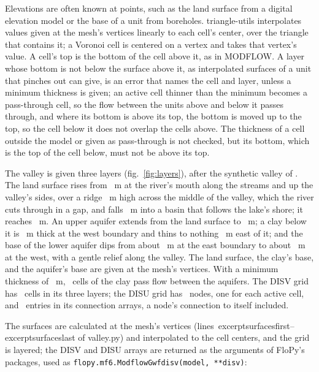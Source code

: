 \documentclass[11pt,twoside,twocolumn]{usgsreport}
\newcommand{\codelead}{\par\vskip 0pt plus 7\baselineskip\penalty -250\vskip 0pt plus -7\baselineskip}
\newcommand{\excerptlines}[1]{lines~\csname excerpt#1first\endcsname--\csname excerpt#1last\endcsname}
\begin{document}
Elevations are often known at points, such as the land surface from a digital elevation model or the base of a unit from boreholes. triangle-utils interpolates values given at the mesh's vertices linearly to each cell's center, over the triangle that contains it; a Voronoi cell is centered on a vertex and takes that vertex's value. A cell's top is the bottom of the cell above it, as in MODFLOW. A layer whose bottom is not below the surface above it, as interpolated surfaces of a unit that pinches out can give, is an error that names the cell and layer, unless a minimum thickness is given; an active cell thinner than the minimum becomes a pass-through cell, so the flow between the units above and below it passes through, and where its bottom is above its top, the bottom is moved up to the top, so the cell below it does not overlap the cells above. The thickness of a cell outside the model or given as pass-through is not checked, but its bottom, which is the top of the cell below, must not be above its top.

The valley is given three layers (fig.~\ref{fig:layers}), after the synthetic valley of \citet{hughes2024flopy}. The land surface rises from \rivermouth~m at the river's mouth along the streams and up the valley's sides, over a ridge \ridgeheight~m high across the middle of the valley, which the river cuts through in a gap, and falls \lakedepth~m into a basin that follows the lake's shore; it reaches \landsurfacemax~m. An upper aquifer extends from the land surface to \upperbottom~m; a clay below it is \claythickness~m thick at the west boundary and thins to nothing \clayedge~m east of it; and the base of the lower aquifer dips from about \baseeast~m at the east boundary to about \basewest~m at the west, with a gentle relief along the valley. The land surface, the clay's base, and the aquifer's base are given at the mesh's vertices. With a minimum thickness of \minimumthickness~m, \passthroughcells\ cells of the clay pass flow between the aquifers. The DISV grid has \disvcells\ cells in its three layers; the DISU grid has \disunodes\ nodes, one for each active cell, and \disuconnections\ entries in its connection arrays, a node's connection to itself included.

\codelead
The surfaces are calculated at the mesh's vertices (\excerptlines{surfaces} of valley.py) and interpolated to the cell centers, and the grid is layered; the DISV and DISU arrays are returned as the arguments of FloPy's packages, used as \texttt{flopy.mf6.ModflowGwfdisv(model, **disv)}:
\end{document}
